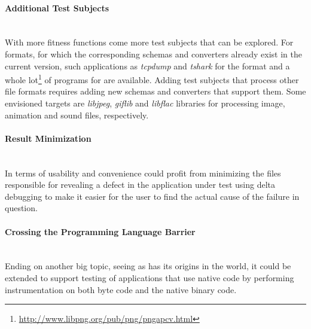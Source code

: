 \paragraph{Additional Test Subjects} ~\\
With more fitness functions come more test subjects that can be explored. For formats, for which the
corresponding schemas and converters already exist in the current version, such applications as \emph{tcpdump}
and \emph{tshark} for the \pcap format and a whole
lot\footnote{\url{http://www.libpng.org/pub/png/pngapcv.html}} of programs for \png are available.
Adding test subjects that process other file formats requires adding new schemas and converters that
support them. Some envisioned targets are \emph{libjpeg}, \emph{giflib} and \emph{libflac} libraries for
processing image, animation and sound files, respectively.
\paragraph{Result Minimization} ~\\
In terms of usability and convenience \xmlmate could profit from minimizing the files responsible for
revealing a defect in the application under test using delta debugging\cite{zeller2002simplifying} to make it
easier for the user to find the actual cause of the failure in question.
\paragraph{Crossing the Programming Language Barrier} ~\\
Ending on another big topic, seeing as \xmlmate has its origins in the \java world, it could be extended
to support testing of \java applications that use native code by performing instrumentation on both \java
byte code and the native binary code. 

{\color{white}{Thank you for reading the digital version and not printing this out on paper! :)}}